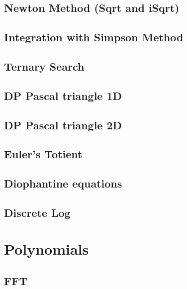 \documentclass[10pt]{article}
\begin{document}
\begin{multicols*}{2}
\subsection{Newton Method (Sqrt and iSqrt)}

\subsection{Integration with Simpson Method}

\subsection{Ternary Search}

\subsection{DP Pascal triangle 1D}

\subsection{DP Pascal triangle 2D}



\subsection{Euler's Totient}


\subsection{Diophantine equations}


\subsection{Discrete Log}


\section{Polynomials}

\subsection{FFT}



\end{multicols*}
\end{document}
